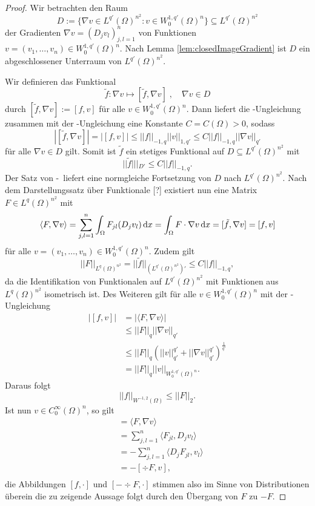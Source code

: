 \begin{proof}
  Wir betrachten den Raum
  $$
  D := \{\nabla v \in L^{q'}(\Omega)^{n^2} \colon v \in W_0^{1,q'}(\Omega)^n\} \subseteq L^{q'}(\Omega)^{n^2}
  $$
  der Gradienten $\nabla v = (D_j v_l)_{j,l=1}^n$ von Funktionen $v = (v_1,\dots,v_n) \in W_0^{1,q'}(\Omega)^n$.
  Nach Lemma \ref{lem:closedImageGradient} ist $D$ ein abgeschlossener Unterraum von $L^{q'}(\Omega)^{n^2}$.

  Wir definieren das Funktional
  $$
  \tilde f \colon \nabla v \mapsto [\tilde f, \nabla v]\;, \quad \nabla v \in D
  $$
  durch $[\tilde f, \nabla v] := [f, v]$ für alle $v \in W_0^{1,q'}(\Omega)^n$.
  Dann liefert die \poincare\hyp{}Ungleichung zusammen mit der \hoelder\hyp{}Ungleichung eine Konstante $C = C(\Omega) > 0$, sodass 
  $$
  |[\tilde f, \nabla v]| 
  = |[f, v]| 
  \leq ||f||_{-1,q} ||v||_{1,q'}
  \leq C ||f||_{-1,q} ||\nabla v ||_{q'}
  $$
  für alle $\nabla v \in D$ gilt.
  Somit ist $\tilde f$ ein stetiges Funktional auf $D \subseteq L^{q'}(\Omega)^{n^2}$ mit 
  $$||\tilde f|||_{D'} \leq C||f||_{-1,q}.$$
  Der Satz von \hahn\hyp{}\banach\ liefert eine normgleiche Fortsetzung von $D$ nach $L^{q'}(\Omega)^{n^2}$.
  Nach dem Darstellungssatz über Funktionale \cite{werner2011fa}[?] existiert nun eine Matrix $F \in L^{q}(\Omega)^{n^2}$ mit
  $$
  \langle F, \nabla v \rangle
  = \sum_{j,l=1}^n \int_\Omega F_{jl}(D_j v_l) \, {\operatorname{d}\!{x}}
  = \int_\Omega F \cdot \nabla v \, {\operatorname{d}\!{x}}
  = [\tilde f, \nabla v] 
  = [f, v]
  $$
  für alle $v = (v_1,\dots,v_n) \in W_0^{1,q'}(\Omega)^n$.
  Zudem gilt
  $$ ||F||_{L^q(\Omega)^{n^2}} = ||\tilde f||_{(L^{q'}(\Omega)^{n^2})'} \leq C ||f||_{-1,q},$$
  da die Identifikation von Funktionalen auf $L^{q'}(\Omega)^{n^2}$ mit Funktionen aus $L^q(\Omega)^{n^2}$ isometrisch ist.
  Des Weiteren gilt für alle $v \in W_0^{1,q'}(\Omega)^n$ mit der \hoelder\hyp{}Ungleichung
  \begin{align*}
    |[f,v]| 
    &= |\langle F, \nabla v\rangle|  \\
    &\leq ||F||_q ||\nabla v||_{q'}  \\
    &\leq ||F||_q (||v||_{q'}^{q'} + ||\nabla v||_{q'}^{q'})^{\frac{1}{q'}} \\
    &= ||F||_q ||v||_{W_0^{1,q'}(\Omega)^n}.
  \end{align*}
  Daraus folgt
  $$
  ||f||_{W^{-1,2}(\Omega)} \leq ||F||_2.
  $$
  Ist nun $v \in C_0^\infty(\Omega)^n$, so gilt
  \begin{align*}
    [f,v]
    &= \langle F, \nabla v\rangle \\
    &= \sum_{j,l=1}^n \langle F_{jl}, D_j v_l \rangle \\
    &= -\sum_{j,l=1}^n \langle D_j F_{jl}, v_l \rangle \\
    &= -[\div F, v], \\
  \end{align*}
  die Abbildungen $[f,\cdot]$ und $[-\div F, \cdot]$ stimmen also im Sinne von Distributionen überein die zu zeigende Aussage folgt durch den Übergang von $F$ zu $-F$.
\end{proof}

